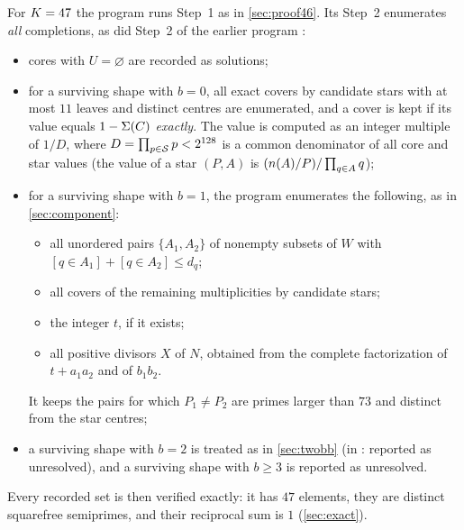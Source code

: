 \documentclass[11pt]{article}
\begin{document}
For $K=47$ the program  runs Step~1 as in \cref{sec:proof46}. Its Step~2 enumerates \emph{all} completions, as did Step~2 of the earlier program :
\begin{itemize}
\item cores with $U=\varnothing$ are recorded as solutions;
\item for a surviving shape with $b=0$, all exact covers by candidate stars with at most $11$ leaves and distinct centres are enumerated, and a cover is kept if its value equals $1-\Sigma(C)$ \emph{exactly}. The value is computed as an integer multiple of $1/D$, where $D=\prod_{p\in\mathcal{S}}p<2^{128}$ is a common denominator of all core and star values (the value of a star $(P,A)$ is $(n(A)/P)/\prod_{q\in A}q$);
\item for a surviving shape with $b=1$, the program enumerates the following, as in \cref{sec:component}:
  \begin{itemize}
  \item all unordered pairs $\{A_1,A_2\}$ of nonempty subsets of $W$ with $[q\in A_1]+[q\in A_2]\le d_q$;
  \item all covers of the remaining multiplicities by candidate stars;
  \item the integer $t$, if it exists;
  \item all positive divisors $X$ of $N$, obtained from the complete factorization of $t+a_1a_2$ and of $b_1b_2$.
  \end{itemize}
  It keeps the pairs for which $P_1\ne P_2$ are primes larger than $73$ and distinct from the star centres;
\item a surviving shape with $b=2$ is treated as in \cref{sec:twobb} (in : reported as unresolved), and a surviving shape with $b\ge3$ is reported as unresolved.
\end{itemize}
Every recorded set is then verified exactly: it has $47$ elements, they are distinct squarefree semiprimes, and their reciprocal sum is $1$ (\cref{sec:exact}).
\end{document}
